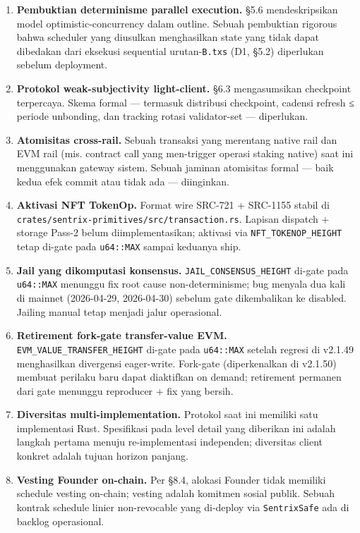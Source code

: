 \documentclass[11pt,a4paper]{article}
\providecommand{\tightlist}{\setlength{\itemsep}{0pt}\setlength{\parskip}{0pt}}
\begin{document}
\begin{enumerate}
\def\labelenumi{\arabic{enumi}.}
\tightlist
\item
  \textbf{Pembuktian determinisme parallel execution.} §5.6 mendeskripsikan model optimistic-concurrency dalam outline. Sebuah pembuktian rigorous bahwa scheduler yang diusulkan menghasilkan state yang tidak dapat dibedakan dari eksekusi sequential urutan-\texttt{B.txs} (D1, §5.2) diperlukan sebelum deployment.
\item
  \textbf{Protokol weak-subjectivity light-client.} §6.3 mengasumsikan checkpoint terpercaya. Skema formal --- termasuk distribusi checkpoint, cadensi refresh ≤ periode unbonding, dan tracking rotasi validator-set --- diperlukan.
\item
  \textbf{Atomisitas cross-rail.} Sebuah transaksi yang merentang native rail dan EVM rail (mis. contract call yang men-trigger operasi staking native) saat ini menggunakan gateway sistem. Sebuah jaminan atomisitas formal --- baik kedua efek commit atau tidak ada --- diinginkan.
\item
  \textbf{Aktivasi NFT TokenOp.} Format wire SRC-721 + SRC-1155 stabil di \texttt{crates/sentrix-primitives/src/transaction.rs}. Lapisan dispatch + storage Pass-2 belum diimplementasikan; aktivasi via \texttt{NFT\_TOKENOP\_HEIGHT} tetap di-gate pada \texttt{u64::MAX} sampai keduanya ship.
\item
  \textbf{Jail yang dikomputasi konsensus.} \texttt{JAIL\_CONSENSUS\_HEIGHT} di-gate pada \texttt{u64::MAX} menunggu fix root cause non-determinisme; bug menyala dua kali di mainnet (2026-04-29, 2026-04-30) sebelum gate dikembalikan ke disabled. Jailing manual tetap menjadi jalur operasional.
\item
  \textbf{Retirement fork-gate transfer-value EVM.} \texttt{EVM\_VALUE\_TRANSFER\_HEIGHT} di-gate pada \texttt{u64::MAX} setelah regresi di v2.1.49 menghasilkan divergensi eager-write. Fork-gate (diperkenalkan di v2.1.50) membuat perilaku baru dapat diaktifkan on demand; retirement permanen dari gate menunggu reproducer + fix yang bersih.
\item
  \textbf{Diversitas multi-implementation.} Protokol saat ini memiliki satu implementasi Rust. Spesifikasi pada level detail yang diberikan ini adalah langkah pertama menuju re-implementasi independen; diversitas client konkret adalah tujuan horizon panjang.
\item
  \textbf{Vesting Founder on-chain.} Per §8.4, alokasi Founder tidak memiliki schedule vesting on-chain; vesting adalah komitmen sosial publik. Sebuah kontrak schedule linier non-revocable yang di-deploy via \texttt{SentrixSafe} ada di backlog operasional.
\end{enumerate}
\end{document}
